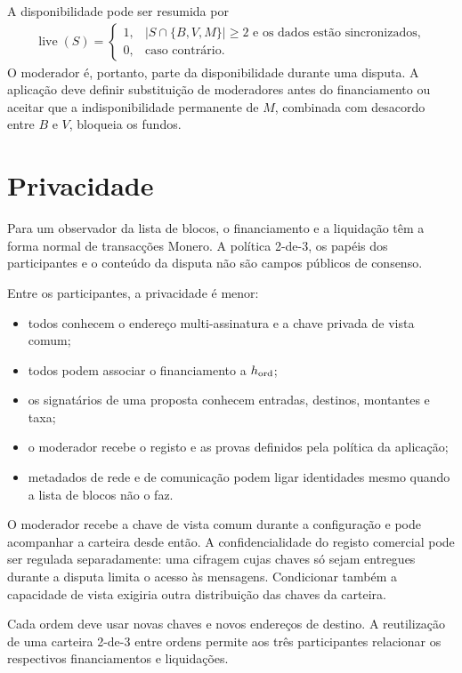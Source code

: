 A disponibilidade pode ser resumida por
\begin{align}
 \operatorname{live}(S)
 =
 \begin{cases}
 1,&|S\cap\{B,V,M\}|\geq2
      \text{ e os dados estão sincronizados},\\
 0,&\text{caso contrário}.
 \end{cases}
 \label{eq:escrow-liveness}
\end{align}
O moderador é, portanto, parte da disponibilidade durante uma disputa. A
aplicação deve definir substituição de moderadores antes do financiamento ou
aceitar que a indisponibilidade permanente de \(M\), combinada com desacordo
entre \(B\) e \(V\), bloqueia os fundos.

\section{Privacidade}
\label{sec:escrow-privacy}

Para um observador da lista de blocos, o financiamento e a liquidação têm a
forma normal de transacções Monero. A política 2-de-3, os papéis dos
participantes e o conteúdo da disputa não são campos públicos de consenso.

Entre os participantes, a privacidade é menor:

\begin{itemize}
 \item todos conhecem o endereço multi-assinatura e a chave privada de vista
 comum;
 \item todos podem associar o financiamento a \(h_{\rm ord}\);
 \item os signatários de uma proposta conhecem entradas, destinos, montantes
 e taxa;
 \item o moderador recebe o registo e as provas definidos pela política da
 aplicação;
 \item metadados de rede e de comunicação podem ligar identidades mesmo
 quando a lista de blocos não o faz.
\end{itemize}

O moderador recebe a chave de vista comum durante a configuração e pode
acompanhar a carteira desde então. A confidencialidade do registo comercial
pode ser regulada separadamente: uma cifragem cujas chaves só sejam entregues
durante a disputa limita o acesso às mensagens. Condicionar também a
capacidade de vista exigiria outra distribuição das chaves da carteira.

Cada ordem deve usar novas chaves e novos endereços de destino. A reutilização
de uma carteira 2-de-3 entre ordens permite aos três participantes relacionar
os respectivos financiamentos e liquidações.

